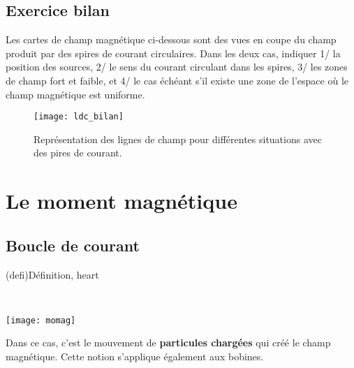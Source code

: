 \documentclass[../../main/main.tex]{subfiles}
\begin{document}
\subsection{Exercice bilan}
\label{ssec:bilandir}
Les cartes de champ magnétique ci-dessous sont des vues en coupe du champ
produit par des spires de courant circulaires. Dans les deux cas, indiquer 1/ la
position des sources, 2/ le sens du courant circulant dans les spires, 3/ les
zones de champ fort et faible, et 4/ le cas échéant s'il existe une zone de
l'espace où le champ magnétique est uniforme.
\begin{figure}[h]
	\centering
	\texttt{[image: ldc\_bilan]}
	\caption{Représentation des lignes de champ pour différentes situations avec
		des pires de courant.}
	\label{fig:ldc_bilan}
\end{figure}

\vspace*{-10pt}

\section{Le moment magnétique}
\label{sec:momag}
\subsection{Boucle de courant}
\label{ssec:magboucle}
\begin{tcb}(defi){Définition, heart}
	\begin{minipage}[t]{.48\linewidth}
	\end{minipage}
	\hfill
	\begin{minipage}[t]{.48\linewidth}
		~
		\vspace{0pt}
		\begin{center}
			\texttt{[image: momag]}
			\label{fig:momag}
		\end{center}
	\end{minipage}
\end{tcb}

Dans ce cas, c'est le mouvement de \textbf{particules chargées} qui créé le
champ magnétique. Cette notion s'applique également aux bobines.
\end{document}
